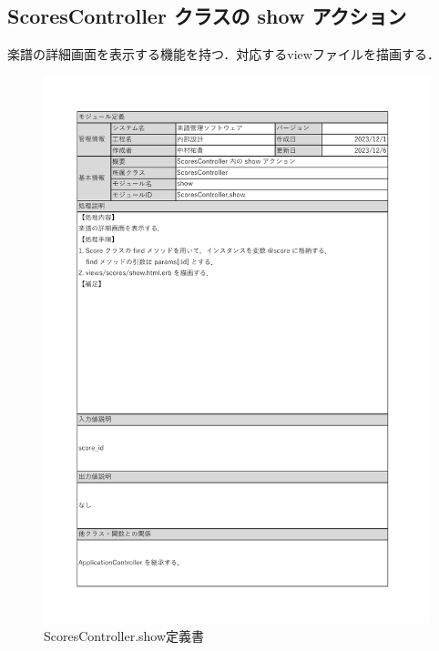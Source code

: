 \subsection*{ScoresController クラスの show アクション}
楽譜の詳細画面を表示する機能を持つ．対応するviewファイルを描画する．
\begin{figure}[H]
    \centering
    \includegraphics[scale=0.6]{img/Scores/xlsx/ScoresController_show.pdf}
    \vspace{-1cm}
    \caption{ScoresController.show定義書}
\end{figure}
